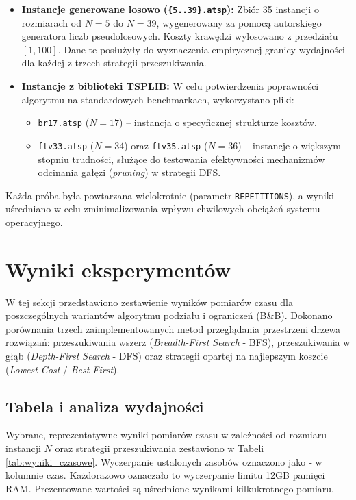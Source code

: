 \documentclass[12pt, a4paper]{article}
\begin{document}
\begin{itemize}
	\item \textbf{Instancje generowane losowo (\texttt{\{5..39\}.atsp}):} Zbiór 35 instancji o rozmiarach od $N=5$ do $N=39$, wygenerowany za pomocą autorskiego generatora liczb pseudolosowych. Koszty krawędzi wylosowano z przedziału $[1, 100]$. Dane te posłużyły do wyznaczenia empirycznej granicy wydajności dla każdej z trzech strategii przeszukiwania.
	\item \textbf{Instancje z biblioteki TSPLIB:} W celu potwierdzenia poprawności algorytmu na standardowych benchmarkach, wykorzystano pliki:
	\begin{itemize}
		\item \texttt{br17.atsp} ($N=17$) – instancja o specyficznej strukturze kosztów.
		\item \texttt{ftv33.atsp} ($N=34$) oraz \texttt{ftv35.atsp} ($N=36$) – instancje o większym stopniu trudności, służące do testowania efektywności mechanizmów odcinania gałęzi (\textit{pruning}) w strategii DFS.
	\end{itemize}
\end{itemize}

Każda próba była powtarzana wielokrotnie (parametr \texttt{REPETITIONS}), a wyniki uśredniano w celu zminimalizowania wpływu chwilowych obciążeń systemu operacyjnego.
	
	
\section{Wyniki eksperymentów}

W tej sekcji przedstawiono zestawienie wyników pomiarów czasu dla poszczególnych wariantów algorytmu podziału i ograniczeń (B\&B). Dokonano porównania trzech zaimplementowanych metod przeglądania przestrzeni drzewa rozwiązań: przeszukiwania wszerz (\textit{Breadth-First Search} - BFS), przeszukiwania w głąb (\textit{Depth-First Search} - DFS) oraz strategii opartej na najlepszym koszcie (\textit{Lowest-Cost} / \textit{Best-First}).

\subsection{Tabela i analiza wydajności}

Wybrane, reprezentatywne wyniki pomiarów czasu w zależności od rozmiaru instancji $N$ oraz strategii przeszukiwania zestawiono w Tabeli \ref{tab:wyniki_czasowe}. Wyczerpanie ustalonych zasobów oznaczono jako 
\textit{-} w kolumnie czas. Każdorazowo oznaczało to wyczerpanie limitu 12GB pamięci RAM. Prezentowane wartości są uśrednione wynikami kilkukrotnego pomiaru.
\end{document}
